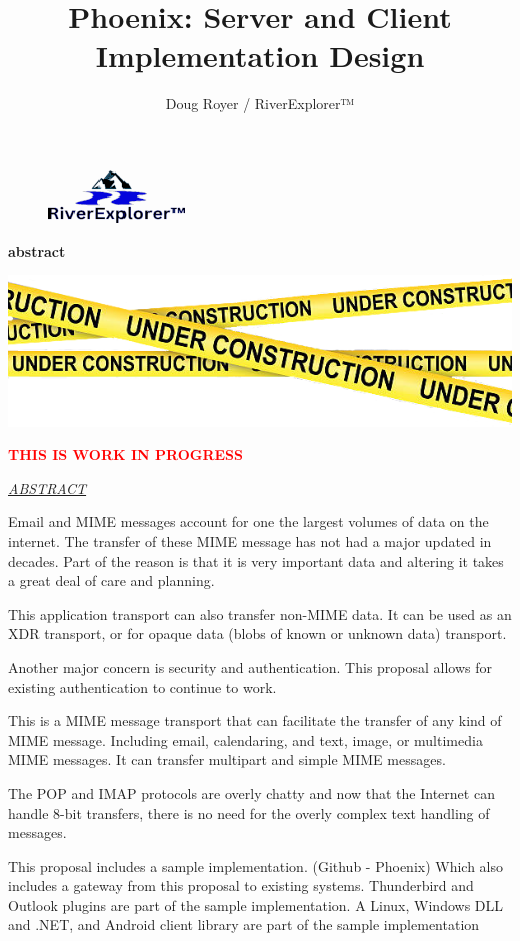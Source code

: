 \documentclass[2pt]{book}
\author{Doug Royer / RiverExplorer™}
\title{Phoenix: Server and Client Implementation Design}
\newenvironment{abstract}
{%
  \small
  \begin{center}
    \bfseries{abstract}
  \end{center}
}
{}
\begin{document}
\maketitle
\frontmatter
\begin{figure}
  \centering
  \includegraphics{RiverExplorerLLC-Logo-BLACK-131x50-Transparent.ps.png}
\end{figure}

\begin{abstract}

  \includegraphics{UnderConstruction.png}

  \begin{center}
    \Huge{\textcolor{red}{\textbf{THIS IS WORK IN PROGRESS}}}
  \end{center}
  
  \begin{center}
    \underline{\textit{ABSTRACT}}
  \end{center}
  
  Email and MIME messages account for one the largest volumes of data
  on the internet. The transfer of these MIME message has not had a
  major updated in decades.
  Part of the reason is that it is very important data and altering it
  takes a great deal of care and planning.

  This application transport can also transfer non-MIME data.
  It can be used as an XDR transport, or for opaque data (blobs
  of known or unknown data) transport.

  Another major concern is security and authentication.
  This proposal allows for existing authentication to continue to work.

  This is a MIME message transport that can facilitate the transfer
  of any kind of MIME message.
  Including email, calendaring, and text, image, or multimedia MIME
  messages. It can transfer multipart and simple MIME messages.

  The POP and IMAP protocols are overly chatty and now that the
  Internet can handle 8-bit transfers, there is no need for the
  overly complex text handling of messages.

  This proposal includes a sample implementation.
  (Github - Phoenix) Which also includes a gateway from this proposal
  to existing systems.
  Thunderbird and Outlook plugins are part of the sample implementation.
  A Linux, Windows DLL and .NET, and Android client library are
  part of the sample implementation
  
\end{abstract}
\end{document}
